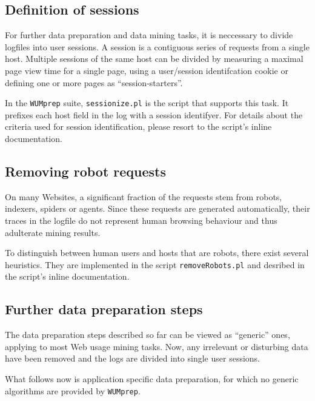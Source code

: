 \documentclass[a4paper]{article}
\begin{document}
\subsection{Definition of sessions}
\label{sec:defineSessions}

For further data preparation and data mining tasks, it is neccessary to
divide logfiles into user sessions. A session is a contiguous series of
requests from a single host. Multiple sessions of the same host can be
divided by measuring a maximal page view time for a single page, using a
user/session identifcation cookie or defining one or more pages as
``session-starters''.

In the \texttt{WUMprep} suite, \texttt{sessionize.pl} is the script that
supports this task. It prefixes each host field in the log with a session
identifyer. For details about the criteria used for session identification,
please resort to the script's inline documentation.


\subsection{Removing robot requests}
\label{sec:removeRobots}

On many Websites, a significant fraction of the requests stem from robots,
indexers, spiders or agents. Since these requests are generated
automatically, their traces in the logfile do not represent human browsing
behaviour and thus adulterate mining results.

To distinguish between human users and hosts that are robots, there exist
several heuristics. They are implemented in the script
\texttt{removeRobots.pl} and desribed in the script's inline documentation.


\subsection{Further data preparation steps}
\label{sec:furtherSteps}

The data preparation steps described so far can be viewed as ``generic''
ones, applying to most Web usage mining tasks. Now, any irrelevant or
disturbing data have been removed and the logs are divided into single user
sessions.

What follows now is application specific data preparation, for which no
generic algorithms are provided by \texttt{WUMprep}.
\end{document}
